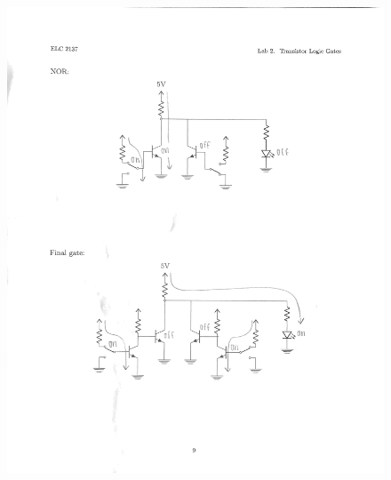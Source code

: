\documentclass[11pt]{article}
\begin{document}
\begin{figure}[ht]
\includegraphics[width = 5in,trim = 1in 1in 0in 3.2in,clip]{demo page 2}

\end{figure}
\end{document}
